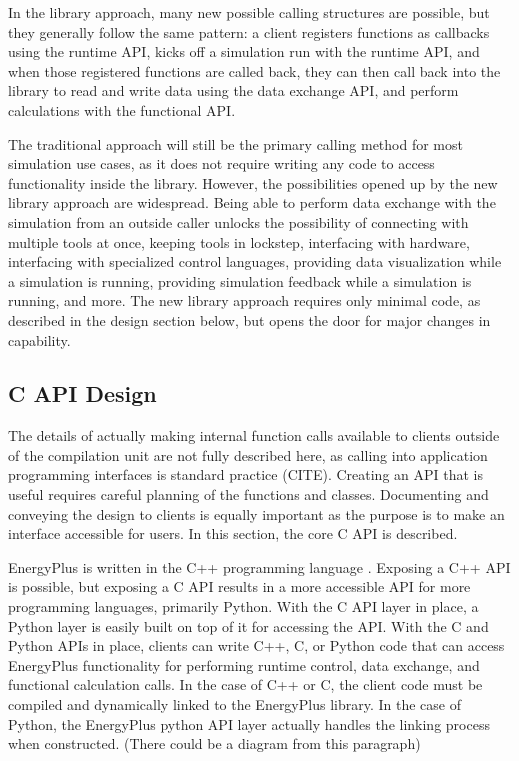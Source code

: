 \documentclass[5p, authoryear]{elsarticle}
\begin{document}
In the library approach, many new possible calling structures are possible, but they generally follow the same pattern: a client registers functions as callbacks using the runtime API, kicks off a simulation run with the runtime API, and when those registered functions are called back, they can then call back into the library to read and write data using the data exchange API, and perform calculations with the functional API.

The traditional approach will still be the primary calling method for most simulation use cases, as it does not require writing any code to access functionality inside the library.  However, the possibilities opened up by the new library approach are widespread.  Being able to perform data exchange with the simulation from an outside caller unlocks the possibility of connecting with multiple tools at once, keeping tools in lockstep, interfacing with hardware, interfacing with specialized control languages, providing data visualization while a simulation is running, providing simulation feedback while a simulation is running, and more.  The new library approach requires only minimal code, as described in the design section below, but opens the door for major changes in capability.

  \subsection{C API Design}
The details of actually making internal function calls available to clients outside of the compilation unit are not fully described here, as calling into application programming interfaces is standard practice (CITE).  Creating an API that is useful requires careful planning of the functions and classes.  Documenting and conveying the design to clients is equally important as the purpose is to make an interface accessible for users.  In this section, the core C API is described.

EnergyPlus is written in the C++ programming language \citep{Stroustrup1995}.  Exposing a C++ API is possible, but exposing a C API results in a more accessible API for more programming languages, primarily Python.  With the C API layer in place, a Python layer is easily built on top of it for accessing the API.  With the C and Python APIs in place, clients can write C++, C, or Python code that can access EnergyPlus functionality for performing runtime control, data exchange, and functional calculation calls.  In the case of C++ or C, the client code must be compiled and dynamically linked to the EnergyPlus library.  In the case of Python, the EnergyPlus python API layer actually handles the linking process when constructed.  (There could be a diagram from this paragraph)
\end{document}

